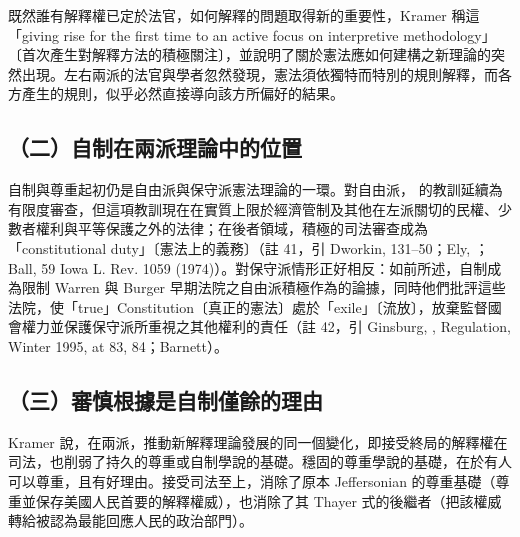 既然誰有解釋權已定於法官，如何解釋的問題取得新的重要性，Kramer 稱這「giving rise for the first time to an active focus on interpretive methodology」〔首次產生對解釋方法的積極關注〕，並說明了關於憲法應如何建構之新理論的突然出現。左右兩派的法官與學者忽然發現，憲法須依獨特而特別的規則解釋，而各方產生的規則，似乎必然直接導向該方所偏好的結果。

\subsection{（二）自制在兩派理論中的位置}

自制與尊重起初仍是自由派與保守派憲法理論的一環。對自由派， 的教訓延續為有限度審查，但這項教訓現在在實質上限於經濟管制及其他在左派關切的民權、少數者權利與平等保護之外的法律；在後者領域，積極的司法審查成為「constitutional duty」〔憲法上的義務〕（註 41，引 Dworkin,  131--50；Ely, ；Ball, 59 Iowa L. Rev. 1059 (1974)）。對保守派情形正好相反：如前所述，自制成為限制 Warren 與 Burger 早期法院之自由派積極作為的論據，同時他們批評這些法院，使「true」Constitution〔真正的憲法〕處於「exile」〔流放〕，放棄監督國會權力並保護保守派所重視之其他權利的責任（註 42，引 Ginsburg, , Regulation, Winter 1995, at 83, 84；Barnett）。

\subsection{（三）審慎根據是自制僅餘的理由}

Kramer 說，在兩派，推動新解釋理論發展的同一個變化，即接受終局的解釋權在司法，也削弱了持久的尊重或自制學說的基礎。穩固的尊重學說的基礎，在於有人可以尊重，且有好理由。接受司法至上，消除了原本 Jeffersonian 的尊重基礎（尊重並保存美國人民首要的解釋權威），也消除了其 Thayer 式的後繼者（把該權威轉給被認為最能回應人民的政治部門）。

